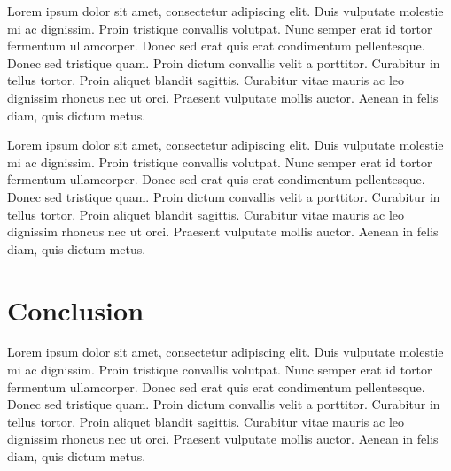 \documentclass[11pt]{article}
\begin{document}
Lorem ipsum dolor sit amet, consectetur adipiscing elit. Duis vulputate molestie mi ac dignissim. Proin tristique convallis volutpat. Nunc semper erat id tortor fermentum ullamcorper. Donec sed erat quis erat condimentum pellentesque. Donec sed tristique quam. Proin dictum convallis velit a porttitor. Curabitur in tellus tortor. Proin aliquet blandit sagittis. Curabitur vitae mauris ac leo dignissim rhoncus nec ut orci. Praesent vulputate mollis auctor. Aenean in felis diam, quis dictum metus.

Lorem ipsum dolor sit amet, consectetur adipiscing elit. Duis vulputate molestie mi ac dignissim. Proin tristique convallis volutpat. Nunc semper erat id tortor fermentum ullamcorper. Donec sed erat quis erat condimentum pellentesque. Donec sed tristique quam. Proin dictum convallis velit a porttitor. Curabitur in tellus tortor. Proin aliquet blandit sagittis. Curabitur vitae mauris ac leo dignissim rhoncus nec ut orci. Praesent vulputate mollis auctor. Aenean in felis diam, quis dictum metus.

\section{Conclusion}
Lorem ipsum dolor sit amet, consectetur adipiscing elit. Duis vulputate molestie mi ac dignissim. Proin tristique convallis volutpat. Nunc semper erat id tortor fermentum ullamcorper. Donec sed erat quis erat condimentum pellentesque. Donec sed tristique quam. Proin dictum convallis velit a porttitor. Curabitur in tellus tortor. Proin aliquet blandit sagittis. Curabitur vitae mauris ac leo dignissim rhoncus nec ut orci. Praesent vulputate mollis auctor. Aenean in felis diam, quis dictum metus.
\end{document}
